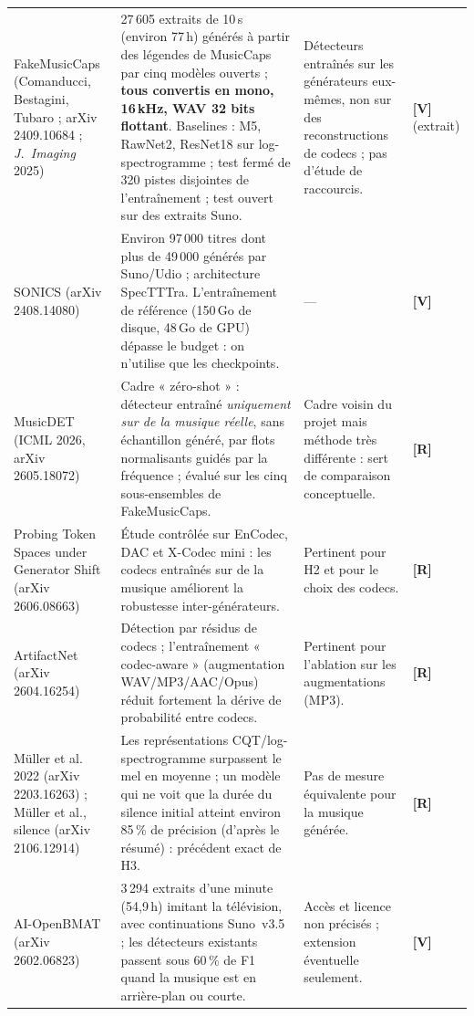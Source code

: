 \documentclass[11pt,a4paper]{article}
\newcommand{\sV}{\textbf{[V]}}
\newcommand{\sR}{\textbf{[R]}}
\begin{document}
{\begin{longtable}{L{2.9cm}L{5.7cm}L{5.0cm}L{0.9cm}}
FakeMusicCaps (Comanducci, Bestagini, Tubaro ; arXiv 2409.10684 ; \emph{J.~Imaging} 2025) &
27\,605 extraits de 10\,s (environ 77\,h) générés à partir des légendes de MusicCaps par cinq modèles ouverts ; \textbf{tous convertis en mono, 16\,kHz, WAV 32 bits flottant}. Baselines : M5, RawNet2, ResNet18 sur log-spectrogramme ; test fermé de 320 pistes disjointes de l'entraînement ; test ouvert sur des extraits Suno. &
Détecteurs entraînés sur les générateurs eux-mêmes, non sur des reconstructions de codecs ; pas d'étude de raccourcis. & \sV{} (extrait)\\
SONICS (arXiv 2408.14080) &
Environ 97\,000 titres dont plus de 49\,000 générés par Suno/Udio ; architecture SpecTTTra. L'entraînement de référence (150\,Go de disque, 48\,Go de GPU) dépasse le budget : on n'utilise que les checkpoints. &
--- & \sV\\
MusicDET (ICML 2026, arXiv 2605.18072) &
Cadre « zéro-shot » : détecteur entraîné \emph{uniquement sur de la musique réelle}, sans échantillon généré, par flots normalisants guidés par la fréquence ; évalué sur les cinq sous-ensembles de FakeMusicCaps. &
Cadre voisin du projet mais méthode très différente : sert de comparaison conceptuelle. & \sR\\
Probing Token Spaces under Generator Shift (arXiv 2606.08663) &
Étude contrôlée sur EnCodec, DAC et X-Codec mini : les codecs entraînés sur de la musique améliorent la robustesse inter-générateurs. &
Pertinent pour H2 et pour le choix des codecs. & \sR\\
ArtifactNet (arXiv 2604.16254) &
Détection par résidus de codecs ; l'entraînement « codec-aware » (augmentation WAV/MP3/AAC/Opus) réduit fortement la dérive de probabilité entre codecs. &
Pertinent pour l'ablation sur les augmentations (MP3). & \sR\\
Müller et al. 2022 (arXiv 2203.16263) ; Müller et al., silence (arXiv 2106.12914) &
Les représentations CQT/log-spectrogramme surpassent le mel en moyenne ; un modèle qui ne voit que la durée du silence initial atteint environ 85\,\% de précision (d'après le résumé) : précédent exact de H3. &
Pas de mesure équivalente pour la musique générée. & \sR\\
AI-OpenBMAT (arXiv 2602.06823) &
3\,294 extraits d'une minute (54,9\,h) imitant la télévision, avec continuations Suno~v3.5 ; les détecteurs existants passent sous 60\,\% de F1 quand la musique est en arrière-plan ou courte. &
Accès et licence non précisés ; extension éventuelle seulement. & \sV\\
\end{longtable}
}
\end{document}
